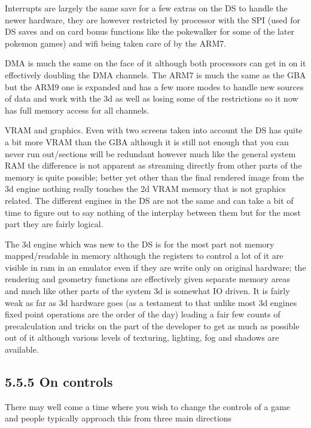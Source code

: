 \documentclass[
]{book}
\begin{document}
Interrupts are largely the same save for a few extras on the DS to handle the newer hardware, they are however restricted by processor with the SPI (used for DS saves and on card bonus functions like the pokewalker for some of the later pokemon games) and wifi being taken care of by the ARM7.

DMA is much the same on the face of it although both processors can get in on it effectively doubling the DMA channels. The ARM7 is much the same as the GBA but the ARM9 one is expanded and has a few more modes to handle new sources of data and work with the 3d as well as losing some of the restrictions so it now has full memory access for all channels.

VRAM and graphics. Even with two screens taken into account the DS has quite a bit more VRAM than the GBA although it is still not enough that you can never run out/sections will be redundant however much like the general system RAM the difference is not apparent as streaming directly from other parts of the memory is quite possible; better yet other than the final rendered image from the 3d engine nothing really touches the 2d VRAM memory that is not graphics related. The different engines in the DS are not the same and can take a bit of time to figure out to say nothing of the interplay between them but for the most part they are fairly logical.

The 3d engine which was new to the DS is for the most part not memory mapped/readable in memory although the registers to control a lot of it are visible in ram in an emulator even if they are write only on original hardware; the rendering and geometry functions are effectively given separate memory areas and much like other parts of the system 3d is somewhat IO driven. It is fairly weak as far as 3d hardware goes (as a testament to that unlike most 3d engines fixed point operations are the order of the day) leading a fair few counts of precalculation and tricks on the part of the developer to get as much as possible out of it although various levels of texturing, lighting, fog and shadows are available.

\hypertarget{on-controls}{%
\subsection{5.5.5 On controls}\label{on-controls}}

There may well come a time where you wish to change the controls of a game and people typically approach this from three main directions
\end{document}
